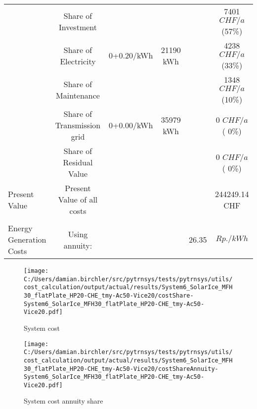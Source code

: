 \documentclass[english]{SPFShortReport}
\begin{document}
\begin{table}[!ht]
\begin{adjustbox}{max width =\textwidth}
\begin{tabular}{l | c c c c c }
 & Share of Investment & &&& 7401 $CHF/a$ (57\%) \\
 & Share of Electricity & 0+0.20/kWh & 21190 kWh &  & 4238 $CHF/a$ (33\%)\\
 & Share of Maintenance & &&& 1348 $CHF/a$ (10\%)\\ 
 & Share of Transmission grid & 0+0.00/kWh & 35979 kWh & &  0 $CHF/a$ ( 0\%)\\
 & Share of Residual Value &&& &  0 $CHF/a$ ( 0\%)\\
Present Value  & Present Value of all costs  & &&& 244249.14 CHF \\
\hline \\ 
 Energy Generation Costs & Using annuity: &&& 26.35 & $Rp./kWh$ \\
\hline
\hline
\end{tabular}
\end{adjustbox}
\label{CostsTable}
\end{table}
\begin{figure}[!htbp]
\begin{center}
\texttt{[image: C:/Users/damian.birchler/src/pytrnsys/tests/pytrnsys/utils/cost\_calculation/output/actual/results/System6\_SolarIce\_MFH30\_flatPlate\_HP20-CHE\_tmy-Ac50-Vice20/costShare-System6\_SolarIce\_MFH30\_flatPlate\_HP20-CHE\_tmy-Ac50-Vice20.pdf]}
\caption{System cost}
\label{systemCost}
\end{center}
\end{figure}
\begin{figure}[!htbp]
\begin{center}
\texttt{[image: C:/Users/damian.birchler/src/pytrnsys/tests/pytrnsys/utils/cost\_calculation/output/actual/results/System6\_SolarIce\_MFH30\_flatPlate\_HP20-CHE\_tmy-Ac50-Vice20/costShareAnnuity-System6\_SolarIce\_MFH30\_flatPlate\_HP20-CHE\_tmy-Ac50-Vice20.pdf]}
\caption{System cost annuity share}
\label{systemCostannuity}
\end{center}
\end{figure}
\end{document}
